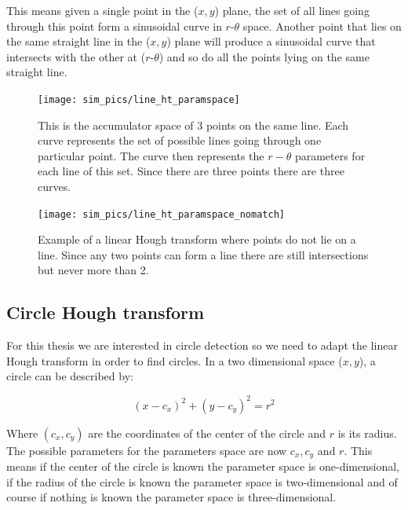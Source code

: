 \documentclass[11pt]{scrreprt}
\begin{document}
This means given a single point in the ($x,y$) plane, the set of all lines going through this point form a sinusoidal curve in 
$r\text{-}\theta$ space. Another point that lies on the same straight line in the ($x,y$) plane will produce a sinusoidal curve that 
intersects with the other at ($r\text{-}\theta$) and so do all the points lying on the same straight line. 


\begin{figure}[tb]
  \centering
  \texttt{[image: sim\_pics/line\_ht\_paramspace]}
  \caption[Example of a linear HT space]{This is the accumulator space of 3 points on the same line. Each curve represents the set of possible lines going through one particular point. The curve then represents the $r-\theta$ parameters for each line of this set. Since there are three points there are three curves.}
  \label{fig:line_ht}
\end{figure}

\begin{figure}[tb]
  \centering
  \texttt{[image: sim\_pics/line\_ht\_paramspace\_nomatch]}
  \caption[Example of a linear HT where points do not lie on a line]{Example of a linear Hough transform where points do not lie on a line. Since any 
  two points can form a line there are still intersections but never more than 2.}
  \label{fig:line_ht_nomatch}
\end{figure}

\subsection{Circle Hough transform} %
\label{sub:circle_hough_transform}

For this thesis we are interested in circle detection so we need to adapt the linear Hough transform in order to find circles. 
In a two dimensional space ($x,y$), a circle can be described by:

\begin{equation}
		(x-c_x)^2 + (y-c_y)^2 = r^2
\end{equation}

Where $(c_x,c_y)$ are the coordinates of the center of the circle and $r$ is its radius. The possible parameters for the parameters space are now $c_x, c_y$ and $r$. This means if the center of the circle is known the parameter space is one-dimensional, if the radius of the circle is known the parameter space is two-dimensional and of course if nothing is known the parameter space is three-dimensional.
\end{document}
